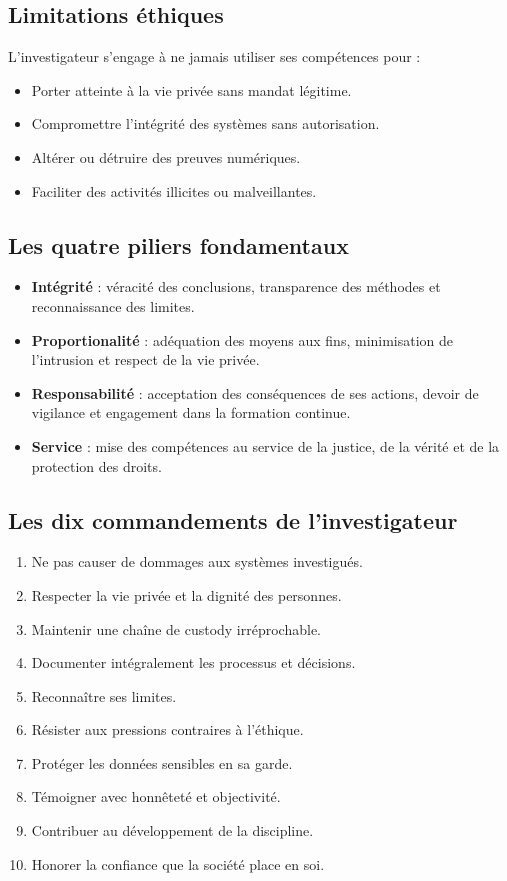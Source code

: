 \documentclass[12pt]{article}
\begin{document}
\subsection{Limitations éthiques}
L’investigateur s’engage à ne jamais utiliser ses compétences pour :
\begin{itemize}[leftmargin=*]
    \item Porter atteinte à la vie privée sans mandat légitime.
    \item Compromettre l’intégrité des systèmes sans autorisation.
    \item Altérer ou détruire des preuves numériques.
    \item Faciliter des activités illicites ou malveillantes.
\end{itemize}

\subsection{Les quatre piliers fondamentaux}
\begin{itemize}[leftmargin=*]
    \item \textbf{Intégrité} : véracité des conclusions, transparence des méthodes et reconnaissance des limites.
    \item \textbf{Proportionalité} : adéquation des moyens aux fins, minimisation de l’intrusion et respect de la vie privée.
    \item \textbf{Responsabilité} : acceptation des conséquences de ses actions, devoir de vigilance et engagement dans la formation continue.
    \item \textbf{Service} : mise des compétences au service de la justice, de la vérité et de la protection des droits.
\end{itemize}

\subsection{Les dix commandements de l’investigateur}
\begin{enumerate}[leftmargin=*]
    \item Ne pas causer de dommages aux systèmes investigués.
    \item Respecter la vie privée et la dignité des personnes.
    \item Maintenir une chaîne de custody irréprochable.
    \item Documenter intégralement les processus et décisions.
    \item Reconnaître ses limites.
    \item Résister aux pressions contraires à l’éthique.
    \item Protéger les données sensibles en sa garde.
    \item Témoigner avec honnêteté et objectivité.
    \item Contribuer au développement de la discipline.
    \item Honorer la confiance que la société place en soi.
\end{enumerate}
\end{document}
